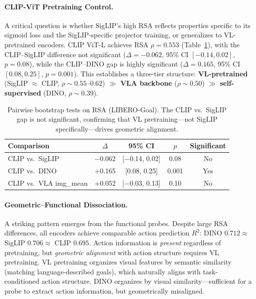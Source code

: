 \documentclass[letterpaper]{article}
\begin{document}
\paragraph{CLIP-ViT Pretraining Control.}
A critical question is whether SigLIP's high RSA reflects properties specific to its sigmoid loss and the SigLIP-specific projector training, or generalizes to VL-pretrained encoders.
CLIP ViT-L achieves RSA $\rho{=}0.553$ (Table~\ref{tab:clip-bootstrap}), with the CLIP--SigLIP difference not significant ($\Delta{=}{-}0.062$, 95\% CI $[-0.14, 0.02]$, $p{=}0.08$), while the CLIP--DINO gap is highly significant ($\Delta{=}0.165$, 95\% CI $[0.08, 0.25]$, $p{=}0.001$).
This establishes a three-tier structure: \textbf{VL-pretrained} (SigLIP $\approx$ CLIP, $\rho{\sim}0.55$--$0.62$) $\gg$ \textbf{VLA backbone} ($\rho{\sim}0.50$) $\gg$ \textbf{self-supervised} (DINO, $\rho{\sim}0.39$).

\begin{table}[t]
\centering
\caption{Pairwise bootstrap tests on RSA (LIBERO-Goal). The CLIP vs.\ SigLIP gap is not significant, confirming that VL pretraining---not SigLIP specifically---drives geometric alignment.}
\label{tab:clip-bootstrap}
\begin{tabular}{@{}lcccc@{}}
\toprule
Comparison & $\Delta$ & 95\% CI & $p$ & Significant \\
\midrule
CLIP vs.\ SigLIP       & $-$0.062 & {[$-$0.14, 0.02]} & 0.08  & No  \\
CLIP vs.\ DINO         & +0.165   & {[0.08, 0.25]}    & 0.001 & Yes \\
CLIP vs.\ VLA img\_mean & +0.052  & {[$-$0.03, 0.13]} & 0.10  & No  \\
\bottomrule
\end{tabular}
\end{table}

\paragraph{Geometric--Functional Dissociation.}
A striking pattern emerges from the functional probes.
Despite large RSA differences, all encoders achieve comparable action prediction $R^2$: DINO $0.712 \approx$ SigLIP $0.706 \approx$ CLIP $0.695$.
Action information is \emph{present} regardless of pretraining, but \emph{geometric alignment} with action structure requires VL pretraining.
VL pretraining organizes visual features by semantic similarity (matching language-described goals), which naturally aligns with task-conditioned action structure.
DINO organizes by visual similarity---sufficient for a probe to extract action information, but geometrically misaligned.
\end{document}
